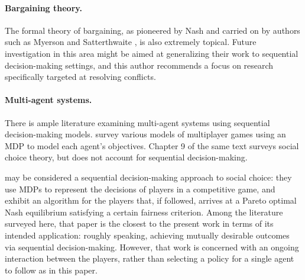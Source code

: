 \documentclass{article}  %
\begin{document}
\paragraph{Bargaining theory.} The formal theory of bargaining, as pioneered by Nash \citep{nash1950bargaining} and carried on by authors such as Myerson \citep{myerson1979incentive} \citep{myerson2013game} and Satterthwaite \citep{myerson1983efficient}, is also extremely topical.  Future investigation in this area might be aimed at generalizing their work to sequential decision-making settings, and this author recommends a focus on research specifically targeted at resolving conflicts.

\paragraph{Multi-agent systems.} There is ample literature examining multi-agent systems using sequential decision-making models.  \citet{shoham2008multiagent} survey various models of multiplayer games using an MDP to model each agent's objectives.  Chapter 9 of the same text surveys social choice theory, but does not account for sequential decision-making.  

\citet{zhang2014fairness} may be considered a sequential decision-making approach to social choice: they use MDPs to represent the decisions of players in a competitive game, and exhibit an algorithm for the players that, if followed, arrives at a Pareto optimal Nash equilibrium satisfying a certain fairness criterion.  Among the literature surveyed here, that paper is the closest to the present work in terms of its intended application: roughly speaking, achieving mutually desirable outcomes via sequential decision-making.  However, that work is concerned with an ongoing interaction between the players, rather than selecting a policy for a single agent to follow as in this paper.  

\end{document}
